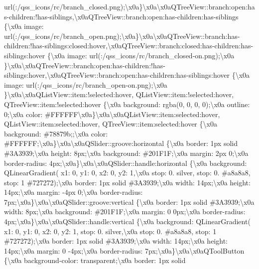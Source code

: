 url(\+:/qss\+\_\+icons/rc/branch\+\_\+closed.\+png);\textbackslash{}x0a\}\textbackslash{}x0a\textbackslash{}x0a\+Q\+Tree\+View\+::branch\+:open\+:has-\/children\+:!has-\/siblings,\textbackslash{}x0a\+Q\+Tree\+View\+::branch\+:open\+:has-\/children\+:has-\/siblings \{\textbackslash{}x0a image\+: url(\+:/qss\+\_\+icons/rc/branch\+\_\+open.\+png);\textbackslash{}x0a\}\textbackslash{}x0a\textbackslash{}x0a\+Q\+Tree\+View\+::branch\+:has-\/children\+:!has-\/siblings\+:closed\+:hover,\textbackslash{}x0a\+Q\+Tree\+View\+::branch\+:closed\+:has-\/children\+:has-\/siblings\+:hover \{\textbackslash{}x0a image\+: url(\+:/qss\+\_\+icons/rc/branch\+\_\+closed-\/on.\+png);\textbackslash{}x0a \}\textbackslash{}x0a\textbackslash{}x0a\+Q\+Tree\+View\+::branch\+:open\+:has-\/children\+:!has-\/siblings\+:hover,\textbackslash{}x0a\+Q\+Tree\+View\+::branch\+:open\+:has-\/children\+:has-\/siblings\+:hover \{\textbackslash{}x0a image\+: url(\+:/qss\+\_\+icons/rc/branch\+\_\+open-\/on.\+png);\textbackslash{}x0a \}\textbackslash{}x0a\textbackslash{}x0a\+Q\+List\+View\+::item\+:!selected\+:hover, Q\+List\+View\+::item\+:!selected\+:hover, Q\+Tree\+View\+::item\+:!selected\+:hover \{\textbackslash{}x0a background\+: rgba(0, 0, 0, 0);\textbackslash{}x0a outline\+: 0;\textbackslash{}x0a color\+: \#\+F\+F\+F\+F\+F\+F\textbackslash{}x0a\}\textbackslash{}x0a\textbackslash{}x0a\+Q\+List\+View\+::item\+:selected\+:hover, Q\+List\+View\+::item\+:selected\+:hover, Q\+Tree\+View\+::item\+:selected\+:hover \{\textbackslash{}x0a background\+: \#78879b;;\textbackslash{}x0a color\+: \#\+F\+F\+F\+F\+F\+F;\textbackslash{}x0a\}\textbackslash{}x0a\textbackslash{}x0a\+Q\+Slider\+::groove\+:horizontal \{\textbackslash{}x0a border\+: 1px solid \#3\+A3939;\textbackslash{}x0a height\+: 8px;\textbackslash{}x0a background\+: \#201\+F1\+F;\textbackslash{}x0a margin\+: 2px 0;\textbackslash{}x0a border-\/radius\+: 4px;\textbackslash{}x0a\}\textbackslash{}x0a\textbackslash{}x0a\+Q\+Slider\+::handle\+:horizontal \{\textbackslash{}x0a background\+: Q\+Linear\+Gradient( x1\+: 0, y1\+: 0, x2\+: 0, y2\+: 1,\textbackslash{}x0a stop\+: 0. silver, stop\+: 0. \#a8a8a8, stop\+: 1 \#727272);\textbackslash{}x0a border\+: 1px solid \#3\+A3939;\textbackslash{}x0a width\+: 14px;\textbackslash{}x0a height\+: 14px;\textbackslash{}x0a margin\+: -\/4px 0;\textbackslash{}x0a border-\/radius\+: 7px;\textbackslash{}x0a\}\textbackslash{}x0a\textbackslash{}x0a\+Q\+Slider\+::groove\+:vertical \{\textbackslash{}x0a border\+: 1px solid \#3\+A3939;\textbackslash{}x0a width\+: 8px;\textbackslash{}x0a background\+: \#201\+F1\+F;\textbackslash{}x0a margin\+: 0 0px;\textbackslash{}x0a border-\/radius\+: 4px;\textbackslash{}x0a\}\textbackslash{}x0a\textbackslash{}x0a\+Q\+Slider\+::handle\+:vertical \{\textbackslash{}x0a background\+: Q\+Linear\+Gradient( x1\+: 0, y1\+: 0, x2\+: 0, y2\+: 1, stop\+: 0. silver,\textbackslash{}x0a stop\+: 0. \#a8a8a8, stop\+: 1 \#727272);\textbackslash{}x0a border\+: 1px solid \#3\+A3939;\textbackslash{}x0a width\+: 14px;\textbackslash{}x0a height\+: 14px;\textbackslash{}x0a margin\+: 0 -\/4px;\textbackslash{}x0a border-\/radius\+: 7px;\textbackslash{}x0a\}\textbackslash{}x0a\textbackslash{}x0a\+Q\+Tool\+Button \{\textbackslash{}x0a background-\/color\+: transparent;\textbackslash{}x0a border\+: 1px solid 